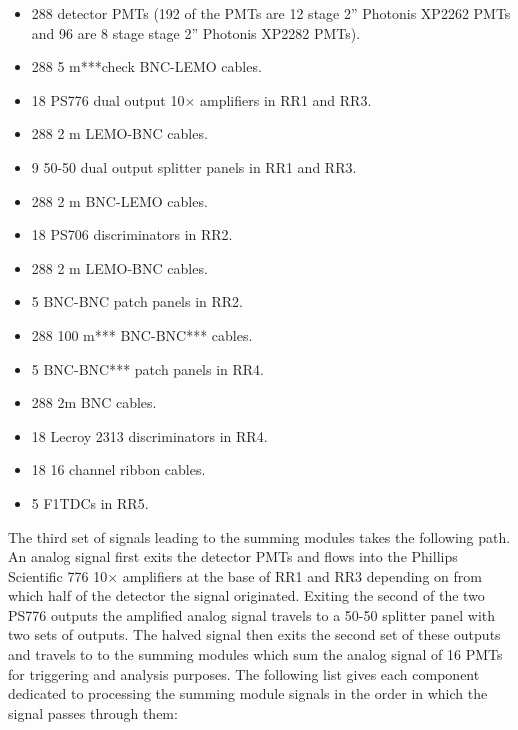 \documentclass[review]{elsarticle}
\begin{document}
\begin{itemize}\itemsep6pt \parskip0pt 
	\item 288 detector PMTs (192 of the PMTs are 12 stage 2'' Photonis XP2262 PMTs and 96 are 8 stage stage 2'' Photonis XP2282 PMTs).
	\item 288 5 m***check BNC-LEMO cables. 
	\item 18 PS776 dual output 10$\times$ amplifiers in RR1 and RR3.
	\item 288 2 m LEMO-BNC cables. 
	\item 9 50-50 dual output splitter panels in RR1 and RR3. 
	\item 288 2 m BNC-LEMO cables.
	\item 18 PS706 discriminators in RR2.
	\item 288 2 m LEMO-BNC cables.
	\item 5 BNC-BNC patch panels in RR2.
	\item 288 100 m*** BNC-BNC*** cables. 
	\item 5 BNC-BNC*** patch panels in RR4. 
	\item 288 2m BNC cables.
	\item 18 Lecroy 2313 discriminators in RR4.
	\item 18 16 channel ribbon cables.
	\item 5 F1TDCs in RR5. 
\end{itemize}

The third set of signals leading to the summing modules takes the following path. An analog signal first exits the detector PMTs and flows into the Phillips Scientific 776 10$\times$ amplifiers at the base of RR1 and RR3 depending on from which half of the detector the signal originated. Exiting the second of the two PS776 outputs the amplified analog signal travels to a 50-50 splitter panel with two sets of outputs. The halved signal then exits the second set of these outputs and travels to to the summing modules which sum the analog signal of 16 PMTs for triggering and analysis purposes. The following list gives each component dedicated to processing the summing module signals in the order in which the signal passes through them:\\
\end{document}
